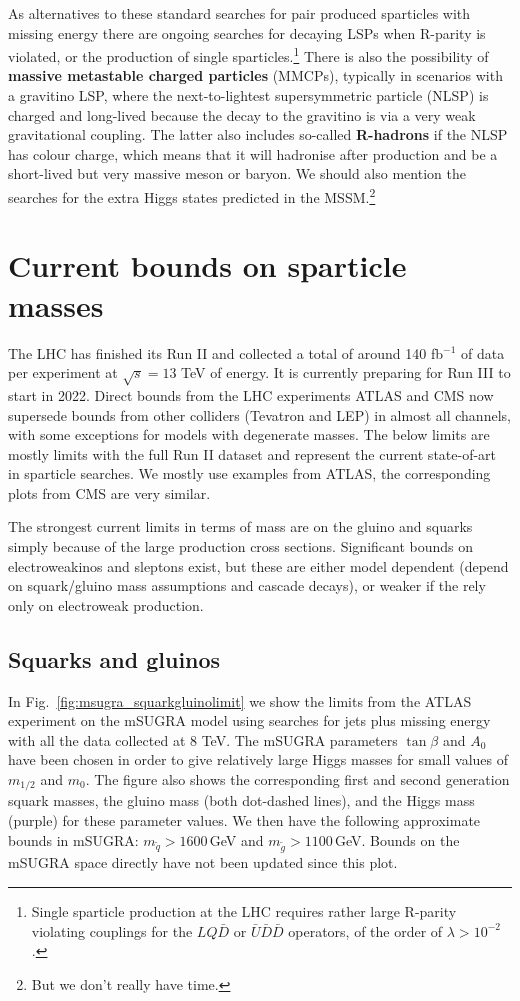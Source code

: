 \documentclass[notes.tex]{subfiles}
\begin{document}
As alternatives to these standard searches for pair produced sparticles with missing energy there are ongoing searches for decaying LSPs when R-parity is violated, or the production of single sparticles.\footnote{Single sparticle production at the LHC requires rather large R-parity violating couplings for the $LQ\bar D$ or $\bar U \bar D\bar D$ operators, of the order of $\lambda > 10^{-2}$.} There is also the possibility of {\bf massive metastable charged particles} (MMCPs), typically in scenarios with a gravitino LSP, where the next-to-lightest supersymmetric particle (NLSP) is charged and long-lived because the decay to the gravitino is via a very weak gravitational coupling. The latter also includes so-called {\bf R-hadrons} if the NLSP has colour charge, which means that it will hadronise after production and be a short-lived but very massive meson or baryon. We should also mention the searches for the extra Higgs states predicted in the MSSM.\footnote{But we don't really have time.}


\section{Current bounds on sparticle masses}
The LHC has finished its Run II and collected a total of around 140 fb$^{-1}$ of data per experiment at $\sqrt{s}=13$ TeV of energy. It is currently preparing for Run III to start in 2022.  Direct bounds from the LHC experiments ATLAS and CMS now supersede bounds from other colliders (Tevatron and LEP) in almost all channels, with some exceptions for models with degenerate masses. The below limits are mostly limits with the full Run II dataset and represent the current state-of-art in sparticle searches. We mostly use examples from ATLAS, the corresponding plots from CMS are very similar.

The strongest current limits in terms of mass are on the gluino and squarks simply because of the large production cross sections. Significant bounds on electroweakinos and sleptons exist, but these are either model dependent (depend on squark/gluino mass assumptions and cascade decays), or weaker if the rely only on electroweak production.

\subsection{Squarks and gluinos}
In Fig.~\ref{fig:msugra_squarkgluinolimit} we show the limits from the ATLAS experiment on the mSUGRA model using searches for jets plus missing energy with all the data collected at 8 TeV. The mSUGRA parameters $\tan\beta$ and $A_0$ have been chosen in order to give relatively large Higgs masses for small values of $m_{1/2}$ and $m_0$. The figure also shows the corresponding first and second generation squark masses, the gluino mass (both dot-dashed lines), and the Higgs mass (purple) for these parameter values. We then have the following approximate bounds in mSUGRA: $m_{\tilde{q}}>1600$\,GeV and $m_{\tilde{g}}> 1100$\,GeV. Bounds on the mSUGRA space directly have not been updated since this plot.
\end{document}
